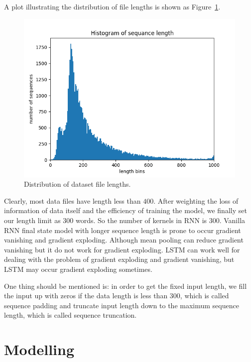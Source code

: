 \documentclass[12pt,letterpaper]{article}
\begin{document}
A plot illustrating the distribution of file lengths is shown as Figure~\ref{fig:length}.
\begin{figure}[h]
    \centering
    \includegraphics[width=.6\linewidth]{lengthdistribution.png}
    \caption{\small Distribution of dataset file lengths.}
    \label{fig:length}
\end{figure}

Clearly, most data files have length less than $400$. After weighting the loss of information of data itself and the efficiency of training the model, we finally set our length limit as $300$ words. So the number of kernels in RNN is 300. Vanilla RNN final state model with longer sequence length is prone to occur gradient vanishing and gradient exploding. Although mean pooling can reduce gradient vanishing but it do not work for gradient exploding. LSTM can work well for dealing with the problem of gradient exploding and gradient vanishing, but LSTM may occur gradient exploding sometimes.

One thing should be mentioned is: in order to get the fixed input length, we fill the input up with zeros if the data length is less than $300$, which is called sequence padding and truncate input length down to the maximum sequence length, which is called sequence truncation.

\section{Modelling}
\end{document}
